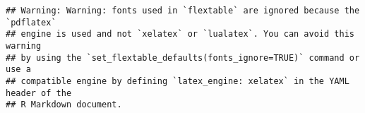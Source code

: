 \documentclass[
]{article}
\newenvironment{Shaded}{\begin{snugshade}}{\end{snugshade}}
\newcommand{\FunctionTok}[1]{\textcolor[rgb]{0.00,0.00,0.00}{#1}}
\newcommand{\NormalTok}[1]{#1}
\newcommand{\OtherTok}[1]{\textcolor[rgb]{0.56,0.35,0.01}{#1}}
\newcommand{\SpecialCharTok}[1]{\textcolor[rgb]{0.00,0.00,0.00}{#1}}
\newcommand{\StringTok}[1]{\textcolor[rgb]{0.31,0.60,0.02}{#1}}
\begin{document}
\begin{Shaded}
\end{Shaded}

\begin{verbatim}
## Warning: Warning: fonts used in `flextable` are ignored because the `pdflatex`
## engine is used and not `xelatex` or `lualatex`. You can avoid this warning
## by using the `set_flextable_defaults(fonts_ignore=TRUE)` command or use a
## compatible engine by defining `latex_engine: xelatex` in the YAML header of the
## R Markdown document.
\end{verbatim}

\providecommand{\docline}[3]{\noalign{\global\setlength{\arrayrulewidth}{#1}}\arrayrulecolor[HTML]{#2}\cline{#3}}

\setlength{\tabcolsep}{2pt}

\renewcommand*{\arraystretch}{1.5}
\end{document}
